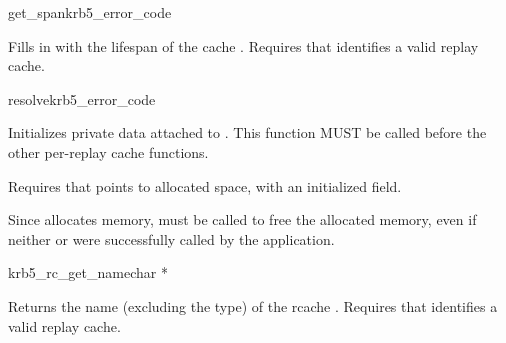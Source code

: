 
\begin{funcdecl}{get_span}{krb5_error_code}{\funcin}
\funcout
{}
\end{funcdecl}
Fills in  with the lifespan of
the cache .
Requires that  identifies a valid replay cache.

\begin{funcdecl}{resolve}{krb5_error_code}{\funcinout}
\funcin
{}
\end{funcdecl}

Initializes private data attached to .  This function MUST
be called before the other per-replay cache functions.

Requires that  points to allocated space, with an
initialized  field.

Since  allocates memory,
 must be called to free the allocated memory,
even if neither  or
 were successfully called by the application.



\begin{funcdecl}{krb5_rc_get_name}{char *}{\funcin}
\end{funcdecl}

Returns the name (excluding the type) of the rcache .
Requires that  identifies a valid replay cache.

